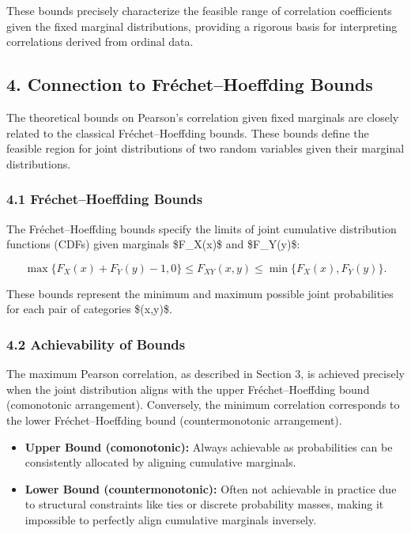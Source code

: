 \documentclass[
  12pt,
]{article}
\providecommand{\tightlist}{%
  \setlength{\itemsep}{0pt}\setlength{\parskip}{0pt}}\usepackage{longtable,booktabs,array}
\begin{document}
These bounds precisely characterize the feasible range of correlation
coefficients given the fixed marginal distributions, providing a
rigorous basis for interpreting correlations derived from ordinal data.

\subsection{4. Connection to Fréchet--Hoeffding
Bounds}\label{connection-to-fruxe9chethoeffding-bounds}

The theoretical bounds on Pearson's correlation given fixed marginals
are closely related to the classical Fréchet--Hoeffding bounds. These
bounds define the feasible region for joint distributions of two random
variables given their marginal distributions.

\subsubsection{4.1 Fréchet--Hoeffding
Bounds}\label{fruxe9chethoeffding-bounds}

The Fréchet--Hoeffding bounds specify the limits of joint cumulative
distribution functions (CDFs) given marginals \$F\_X(x)\$ and
\$F\_Y(y)\$:

\[
\max\{F_X(x) + F_Y(y) - 1, 0\} \leq F_{XY}(x,y) \leq \min\{F_X(x), F_Y(y)\}.
\]

These bounds represent the minimum and maximum possible joint
probabilities for each pair of categories \$(x,y)\$.

\subsubsection{4.2 Achievability of
Bounds}\label{achievability-of-bounds}

The maximum Pearson correlation, as described in Section 3, is achieved
precisely when the joint distribution aligns with the upper
Fréchet--Hoeffding bound (comonotonic arrangement). Conversely, the
minimum correlation corresponds to the lower Fréchet--Hoeffding bound
(countermonotonic arrangement).

\begin{itemize}
\tightlist
\item
  \textbf{Upper Bound (comonotonic):} Always achievable as probabilities
  can be consistently allocated by aligning cumulative marginals.
\item
  \textbf{Lower Bound (countermonotonic):} Often not achievable in
  practice due to structural constraints like ties or discrete
  probability masses, making it impossible to perfectly align cumulative
  marginals inversely.
\end{itemize}
\end{document}
